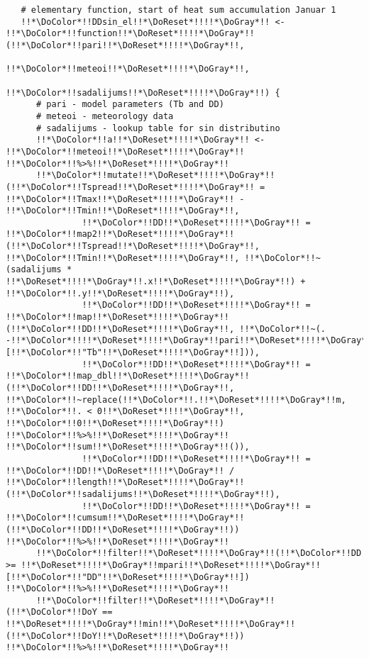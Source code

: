 \begin{verbatim}
   # elementary function, start of heat sum accumulation Januar 1
   !!*\DoColor*!!DDsin_el!!*\DoReset*!!!!*\DoGray*!! <- !!*\DoColor*!!function!!*\DoReset*!!!!*\DoGray*!!(!!*\DoColor*!!pari!!*\DoReset*!!!!*\DoGray*!!,
                        !!*\DoColor*!!meteoi!!*\DoReset*!!!!*\DoGray*!!,
                        !!*\DoColor*!!sadalijums!!*\DoReset*!!!!*\DoGray*!!) {
      # pari - model parameters (Tb and DD)
      # meteoi - meteorology data
      # sadalijums - lookup table for sin distributino
      !!*\DoColor*!!a!!*\DoReset*!!!!*\DoGray*!! <- !!*\DoColor*!!meteoi!!*\DoReset*!!!!*\DoGray*!! !!*\DoColor*!!%>%!!*\DoReset*!!!!*\DoGray*!!
      !!*\DoColor*!!mutate!!*\DoReset*!!!!*\DoGray*!!(!!*\DoColor*!!Tspread!!*\DoReset*!!!!*\DoGray*!! = !!*\DoColor*!!Tmax!!*\DoReset*!!!!*\DoGray*!! - !!*\DoColor*!!Tmin!!*\DoReset*!!!!*\DoGray*!!,
               !!*\DoColor*!!DD!!*\DoReset*!!!!*\DoGray*!! = !!*\DoColor*!!map2!!*\DoReset*!!!!*\DoGray*!!(!!*\DoColor*!!Tspread!!*\DoReset*!!!!*\DoGray*!!, !!*\DoColor*!!Tmin!!*\DoReset*!!!!*\DoGray*!!, !!*\DoColor*!!~(sadalijums * !!*\DoReset*!!!!*\DoGray*!!.x!!*\DoReset*!!!!*\DoGray*!!) + !!*\DoColor*!!.y!!*\DoReset*!!!!*\DoGray*!!),
               !!*\DoColor*!!DD!!*\DoReset*!!!!*\DoGray*!! = !!*\DoColor*!!map!!*\DoReset*!!!!*\DoGray*!!(!!*\DoColor*!!DD!!*\DoReset*!!!!*\DoGray*!!, !!*\DoColor*!!~(. -!!*\DoColor*!!!!*\DoReset*!!!!*\DoGray*!!pari!!*\DoReset*!!!!*\DoGray*!![!!*\DoColor*!!"Tb"!!*\DoReset*!!!!*\DoGray*!!])),
               !!*\DoColor*!!DD!!*\DoReset*!!!!*\DoGray*!! = !!*\DoColor*!!map_dbl!!*\DoReset*!!!!*\DoGray*!!(!!*\DoColor*!!DD!!*\DoReset*!!!!*\DoGray*!!, !!*\DoColor*!!~replace(!!*\DoColor*!!.!!*\DoReset*!!!!*\DoGray*!!m, !!*\DoColor*!!. < 0!!*\DoReset*!!!!*\DoGray*!!, !!*\DoColor*!!0!!*\DoReset*!!!!*\DoGray*!!) !!*\DoColor*!!%>%!!*\DoReset*!!!!*\DoGray*!! !!*\DoColor*!!sum!!*\DoReset*!!!!*\DoGray*!!()),
               !!*\DoColor*!!DD!!*\DoReset*!!!!*\DoGray*!! = !!*\DoColor*!!DD!!*\DoReset*!!!!*\DoGray*!! / !!*\DoColor*!!length!!*\DoReset*!!!!*\DoGray*!!(!!*\DoColor*!!sadalijums!!*\DoReset*!!!!*\DoGray*!!),
               !!*\DoColor*!!DD!!*\DoReset*!!!!*\DoGray*!! = !!*\DoColor*!!cumsum!!*\DoReset*!!!!*\DoGray*!!(!!*\DoColor*!!DD!!*\DoReset*!!!!*\DoGray*!!)) !!*\DoColor*!!%>%!!*\DoReset*!!!!*\DoGray*!!
      !!*\DoColor*!!filter!!*\DoReset*!!!!*\DoGray*!!(!!*\DoColor*!!DD >= !!*\DoReset*!!!!*\DoGray*!!mpari!!*\DoReset*!!!!*\DoGray*!![!!*\DoColor*!!"DD"!!*\DoReset*!!!!*\DoGray*!!]) !!*\DoColor*!!%>%!!*\DoReset*!!!!*\DoGray*!!
      !!*\DoColor*!!filter!!*\DoReset*!!!!*\DoGray*!!(!!*\DoColor*!!DoY == !!*\DoReset*!!!!*\DoGray*!!min!!*\DoReset*!!!!*\DoGray*!!(!!*\DoColor*!!DoY!!*\DoReset*!!!!*\DoGray*!!)) !!*\DoColor*!!%>%!!*\DoReset*!!!!*\DoGray*!!

\end{verbatim}
